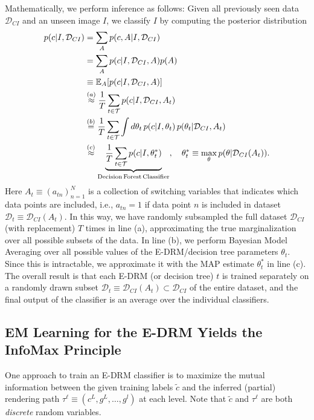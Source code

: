 \documentclass[12pt]{article}
\newcommand{\Expect}[0]{{ \mathbb{E} }}
\newcommand{\D}[0]{{ \mathcal{D} }}
\newcommand{\T}[0]{{ \mathcal{T} }}
\begin{document}
Mathematically, we perform inference as follows: Given all previously seen data $\D_{CI}$ and an unseen image $I$, we classify $I$ by computing the posterior distribution
\begin{align} 
   p(c | I, \D_{CI}) &= \sum_{A} p(c, A | I, \D_{CI})     \nonumber\\
   		           &= \sum_{A} p(c | I, \D_{CI}, A) p(A)     \nonumber\\
   		           &\equiv \Expect_{A} [ p(c | I, \D_{CI}, A) ]     \nonumber\\
   		           &\overset{(a)}{\approx} \frac{1}{T}\sum_{t \in \T} p(c | I, \D_{CI}, A_{t})     \nonumber\\
   		           &\overset{(b)}{=} \frac{1}{T}\sum_{t \in \T} \int d \theta_{t} \, p(c | I,\theta_{t}) \, p(\theta_{t} | \D_{CI}, A_{t})     \nonumber\\
   		           &\overset{(c)}{\approx} 
		                \underbrace{ \frac{1}{T}\sum_{t \in \T} p(c | I,\theta_{t}^{*})}_{\rm Decision\, Forest\, Classifier}, \quad \theta_{t}^{*} \equiv  \max_{\theta} p(\theta | \D_{CI}(A_{t})).
\end{align}
Here $A_{t} \equiv (a_{tn})_{n=1}^{N}$ is a collection of switching variables that indicates which data points are included, i.e., $a_{tn} = 1$ if data point $n$ is included in dataset $\D_t \equiv \D_{CI}(A_{t})$. In this way, we have randomly subsampled the full dataset $\D_{CI}$ (with replacement) $T$ times in line (a), approximating the true marginalization over all possible subsets of the data. In line (b), we perform Bayesian Model Averaging over all possible values of the E-DRM/decision tree parameters $\theta_{t}$. Since this is intractable, we approximate it with the MAP estimate $\theta_{t}^{*}$ in line (c). The overall result is that each E-DRM (or decision tree) $t$ is trained separately on a randomly drawn subset $\D_t \equiv \D_{CI}(A_{t}) \subset \D_{CI}$ of the entire dataset, and the final output of the classifier is an average over the individual classifiers. 

\subsection{EM Learning for the E-DRM Yields the InfoMax Principle}

One approach to train an E-DRM classifier is to maximize the mutual information between the given training labels $\tilde{c}$ and the inferred (partial) rendering path $\tau^{\ell} \equiv (c^{L},g^{L},\ldots,g^{l})$ at each level. Note that $\tilde{c}$ and $\tau^{\ell}$ are both \emph{discrete} random variables.
\end{document}
